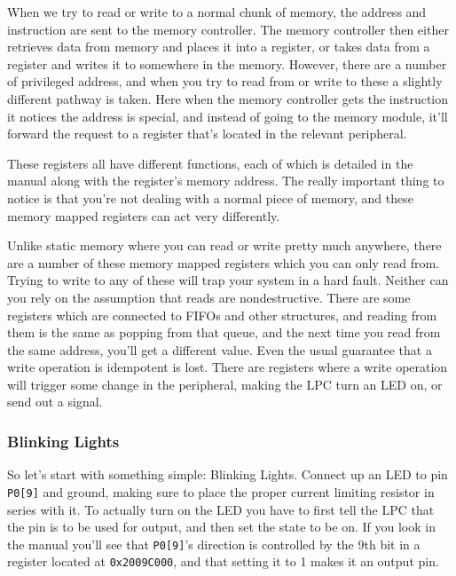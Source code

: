 \documentclass[]{article}
\begin{document}
When we try to read or write to a normal chunk of memory, the address
and instruction are sent to the memory controller. The memory controller
then either retrieves data from memory and places it into a register, or
takes data from a register and writes it to somewhere in the memory.
However, there are a number of privileged address, and when you try to
read from or write to these a slightly different pathway is taken. Here
when the memory controller gets the instruction it notices the address
is special, and instead of going to the memory module, it'll forward the
request to a register that's located in the relevant peripheral.

These registers all have different functions, each of which is detailed
in the manual along with the register's memory address. The really
important thing to notice is that you're not dealing with a normal piece
of memory, and these memory mapped registers can act very differently.

Unlike static memory where you can read or write pretty much anywhere,
there are a number of these memory mapped registers which you can only
read from. Trying to write to any of these will trap your system in a
hard fault. Neither can you rely on the assumption that reads are
nondestructive. There are some registers which are connected to FIFOs
and other structures, and reading from them is the same as popping from
that queue, and the next time you read from the same address, you'll get
a different value. Even the usual guarantee that a write operation is
idempotent is lost. There are registers where a write operation will
trigger some change in the peripheral, making the LPC turn an LED on, or
send out a signal.

\subsubsection{Blinking Lights}

So let's start with something simple: Blinking Lights. Connect up an LED
to pin \texttt{P0{[}9{]}} and ground, making sure to place the proper
current limiting resistor in series with it. To actually turn on the LED
you have to first tell the LPC that the pin is to be used for output,
and then set the state to be on. If you look in the manual you'll see
that \texttt{P0{[}9{]}}'s direction is controlled by the 9th bit in a
register located at \texttt{0x2009C000}, and that setting it to 1 makes
it an output pin. 
\end{document}
